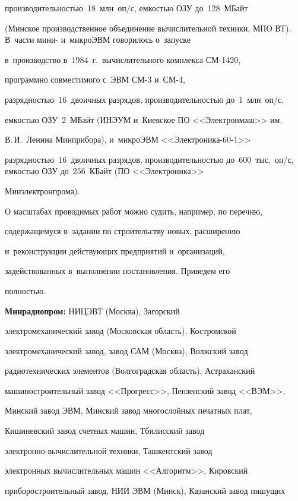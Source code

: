 про\-из\-во\-ди\-тель\-ностью~18~млн~оп\!/\!с, ем\-костью ОЗУ до~128~МБайт 

(Минское производственное объединение вычислительной техники, МПО ВТ). В~час\-ти мини- и~мик\-ро\-ЭВМ говорилось о~за\-пус\-ке 

в~производство в~1984~г.\ вы\-чис\-ли\-тель\-но\-го комплекса \mbox{СМ-1420}, 

программно совместимого с~ЭВМ \mbox{СМ-3} и~\mbox{СМ-4}, 

раз\-ряд\-ностью~16~двоичных разрядов, про\-из\-во\-ди\-тель\-ностью до~1~млн~оп\!/\!с,  

ем\-костью ОЗУ~2~МБайт (ИНЭУМ и~Киевское ПО <<Электронмаш>> им.\ 

В.\,И.~Ленина Минприбора), и~микроЭВМ <<Элект\-ро\-ни\-ка-60-1>> 

раз\-ряд\-ностью~16~двоичных разрядов, про\-из\-во\-ди\-тель\-ностью до~600~тыс.~оп\!/\!с, ем\-костью ОЗУ до~256~КБайт (ПО <<Электроника>> 

Мин\-электрон\-про\-ма).

   

   О масштабах проводимых работ можно судить, например, по перечню, 

содержащемуся в~задании по строительству новых, расширению 

и~реконструкции дей\-ст\-ву\-ющих предприятий и~организаций, 

задействованных в~выполнении по\-ста\-нов\-ле\-ния. Приведем его  

пол\-ностью.

   

   \textbf{Минрадиопром:} НИЦЭВТ (Москва), Загорский 

электромеханический завод (Московская об\-ласть), Костромской 

электромеханический завод, завод САМ (Москва), Волжский завод 

радиотехнических элементов (Волгоградская об\-ласть), Астраханский 

машиностроительный завод <<Прогресс>>, Пензенский завод <<ВЭМ>>, 

Минский завод ЭВМ, Минский завод многослойных печатных плат, 

Кишиневский завод счетных машин, Тбилисский завод  

элект\-рон\-но-вы\-чис\-ли\-тель\-ной техники, Ташкентский завод 

электронных вы\-чис\-ли\-тель\-ных машин <<Алгоритм>>, Кировский 

приборостроительный завод, НИИ ЭВМ (Минск), Казанский завод пишущих 

